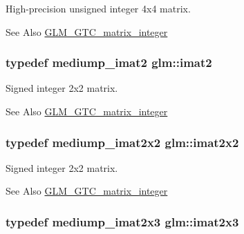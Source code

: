 High-\/precision unsigned integer 4x4 matrix. \begin{DoxySeeAlso}{See Also}
\hyperlink{group__gtc__matrix__integer}{G\-L\-M\-\_\-\-G\-T\-C\-\_\-matrix\-\_\-integer} 
\end{DoxySeeAlso}
\hypertarget{group__gtc__matrix__integer_ga77a581b3366fb63fc72f8f20830003e0}{
\subsubsection[{imat2}]{\setlength{\rightskip}{0pt plus 5cm}typedef mediump\-\_\-imat2 {\bf glm\-::imat2}}}\label{group__gtc__matrix__integer_ga77a581b3366fb63fc72f8f20830003e0}
Signed integer 2x2 matrix. \begin{DoxySeeAlso}{See Also}
\hyperlink{group__gtc__matrix__integer}{G\-L\-M\-\_\-\-G\-T\-C\-\_\-matrix\-\_\-integer} 
\end{DoxySeeAlso}
\hypertarget{group__gtc__matrix__integer_gaf7f44f44d966377666d41ed059524732}{
\subsubsection[{imat2x2}]{\setlength{\rightskip}{0pt plus 5cm}typedef mediump\-\_\-imat2x2 {\bf glm\-::imat2x2}}}\label{group__gtc__matrix__integer_gaf7f44f44d966377666d41ed059524732}
Signed integer 2x2 matrix. \begin{DoxySeeAlso}{See Also}
\hyperlink{group__gtc__matrix__integer}{G\-L\-M\-\_\-\-G\-T\-C\-\_\-matrix\-\_\-integer} 
\end{DoxySeeAlso}
\hypertarget{group__gtc__matrix__integer_ga143bc5177bac9991d84b70da03952516}{
\subsubsection[{imat2x3}]{\setlength{\rightskip}{0pt plus 5cm}typedef mediump\-\_\-imat2x3 {\bf glm\-::imat2x3}}}\label{group__gtc__matrix__integer_ga143bc5177bac9991d84b70da03952516}
